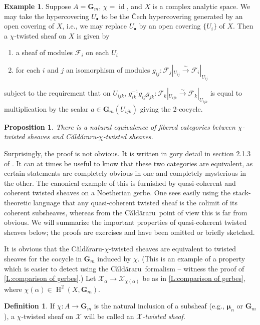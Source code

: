 \documentclass[11pt]{amsart}
\newcommand{\Caldararu}{C\u ald\u araru}
\newcommand{\field}[1]{\mathbf #1}
\newcommand{\ms}[1]{\mathscr #1}
\newcommand{\simto}{\stackrel{\sim}{\to}}
\newcommand{\m}{\boldsymbol{\mu}}
\newcommand{\G}{\field G} %
\renewcommand{\H}{\operatorname{H}}
\renewcommand{\[}{[\!\hspace{0.03em}[}
\renewcommand{\]}{]\!\hspace{0.03em}]}
\renewcommand{\(}{(\!\hspace{0.03em}(}
\renewcommand{\)}{)\!\hspace{0.03em})}
\newcommand{\id}{\operatorname{id}}
\newtheorem{prop}[lem]{Proposition}
\theoremstyle{definition}
\newtheorem{defn}[lem]{Definition}
\newtheorem{example}[lem]{Example}
\theoremstyle{remark}
\newenvironment{exa}{\begin{example}}{\nolinebreak{\hfill $\lozenge$} \end{example}}
\begin{document}
\begin{exa} Suppose $A=\G_{m}$, $\chi=\id$, and $X$ is a complex analytic space.  
We may take the hypercovering $U_{\bullet}$ to be the \v Cech 
hypercovering generated by an open covering of $X$, i.e., we may 
replace $U_{\bullet}$ by an open covering $\{U_{i}\}$ of $X$.  Then 
a $\chi$-twisted sheaf on $X$ is given by 
\begin{enumerate}
    \item a sheaf of modules $\ms F_{i}$ on each $U_{i}$

    \item for each $i$ and $j$ an isomorphism of modules $g_{ij}:\ms 
    F_{j}|_{U_{ij}}\simto\ms F_{i}|_{U_{ij}}$

\end{enumerate}
subject to the requirement that on $U_{ijk}$, 
$g_{ik}^{-1}g_{ij}g_{jk}:\ms F_{k}|_{U_{ijk}}\simto\ms 
F_{k}|_{U_{ijk}}$ is equal to multiplication by the scalar 
$a\in\G_m(U_{ijk})$ giving the 2-cocycle. 
\end{exa}

\begin{prop} There is a natural equivalence of fibered categories between 
$\chi$-twisted sheaves and \Caldararu-$\chi$-twisted sheaves.
\end{prop}
Surprisingly, the proof is not obvious.  It is written in gory detail 
in section 2.1.3 of \cite{mythesis}.  It can at times be useful to know that 
these two categories are equivalent, as certain statements are completely obvious in 
one and completely mysterious in the other.  The canonical example of 
this is furnished by quasi-coherent and coherent twisted sheaves on a 
Noetherian gerbe.  One sees easily using the stack-theoretic language 
that any quasi-coherent twisted sheaf is the colimit of its coherent 
subsheaves, whereas from the \Caldararu\ point of view this is far 
from obvious.  We will summarize the important properties of 
quasi-coherent twisted sheaves below; the proofs are exercises and have been omitted or briefly sketched.

It is obvious that the \Caldararu-$\chi$-twisted 
sheaves are equivalent to twisted sheaves for the cocycle in $\G_{m}$ 
induced by $\chi$.  (This is an example of a property which is easier to detect using the \Caldararu\ formalism -- witness the proof of \ref{L:comparison of gerbes}.)  Let $\ms X_{\alpha}\to\ms X_{\chi(\alpha)}$ be as in 
\ref{L:comparison of gerbes}, where $\chi(\alpha)\in\H^{2}(X,\G_{m})$.  

\begin{defn} If $\chi:A\to\G_{m}$ is the natural inclusion of a 
subsheaf (e.g., $\m_{n}$ or $\G_{m}$), a $\chi$-twisted sheaf on $\ms 
X$ will be called an \emph{$\ms X$-twisted sheaf\/}.
\end{defn}
\end{document}
